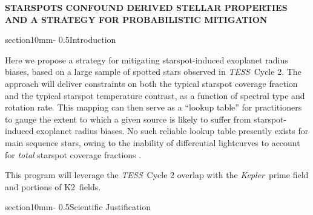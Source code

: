 \documentclass[letterpaper,11pt]{article}
\makeatletter
\renewcommand{\section}{\@startsection%
{section}{1}{0mm}{-\baselineskip}%
{0.5\baselineskip}{\normalfont\Large\bfseries}}%
\newcommand{\tess}{{\it TESS}}
\newcommand{\kepler}{{\it Kepler}}
\newcommand{\ktwo}{{K2}}
\makeatother
\begin{document}
\pagestyle{plain}
\setlength{\bibsep}{0.0pt}
\let\oldbibliography\thebibliography
\renewcommand{\thebibliography}[1]{%
  \oldbibliography{#1}%
  \setlength{\itemsep}{0pt}%
}




\begin{center}
\bfseries\uppercase{%
Starspots confound derived stellar properties and a strategy for probabilistic mitigation
}
\end{center}




\section{Introduction}

Here we propose a strategy for mitigating starspot-induced exoplanet radius biases, based on a large sample of spotted stars observed in \tess\ Cycle 2.  The approach will deliver constraints on both the typical starspot coverage fraction and the typical starspot temperature contrast, as a function of spectral type and rotation rate.  This mapping can then serve as a ``lookup table'' for practitioners to gauge the extent to which a given source is likely to suffer from starspot-induced exoplanet radius biases.  No such reliable lookup table presently exists for main sequence stars, owing to the inability of differential lightcurves to account for \emph{total} starspot coverage fractions \citep{2018ApJ...865..142B}.

This program will leverage the \tess\ Cycle 2 overlap with the \kepler\ prime field and portions of \ktwo\ fields.

\section{Scientific Justification}
\end{document}
